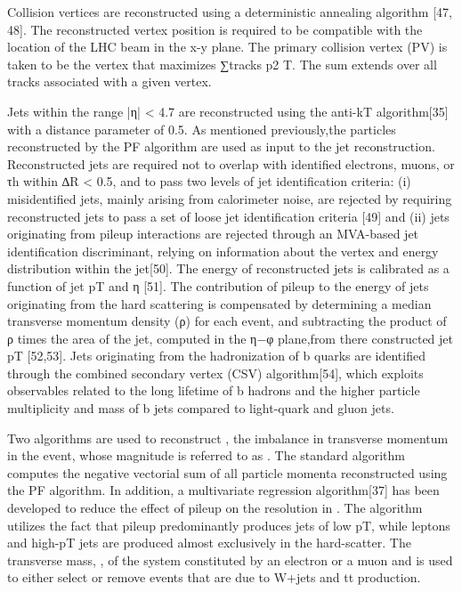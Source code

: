 Collision vertices are reconstructed using a deterministic annealing algorithm [47, 48]. The reconstructed vertex position is required to be compatible with the location of the LHC beam in the x-y plane. The primary collision vertex (PV) is taken to be the vertex that maximizes ∑tracks p2 T. The sum extends over all tracks associated with a given vertex.

Jets within the range |η| < 4.7 are reconstructed using the anti-kT algorithm[35] with a distance parameter of 0.5. As mentioned previously,the particles reconstructed by the PF algorithm are used as input to the jet reconstruction. Reconstructed jets are required not to overlap with identified electrons, muons, or τh within ∆R < 0.5, and to pass two levels of jet identification criteria: (i) misidentified jets, mainly arising from calorimeter noise, are rejected by requiring reconstructed jets to pass a set of loose jet identification criteria [49] and (ii) jets originating from pileup interactions are rejected through an MVA-based jet identification discriminant, relying on information about the vertex and energy distribution within the jet[50]. The energy of reconstructed jets is calibrated as a function of jet pT and η [51]. The contribution of pileup to the energy of jets originating from the hard scattering is compensated by determining a median transverse momentum density (ρ) for each event, and subtracting the product of ρ times the area of the jet, computed in the η−φ plane,from there constructed jet pT [52,53]. Jets originating from the hadronization of b quarks are identiﬁed through the combined secondary vertex (CSV) algorithm[54], which exploits observables related to the long lifetime of b hadrons and the higher particle multiplicity and mass of b jets compared to light-quark and gluon jets.

Two algorithms are used to reconstruct \ptvecmiss , the imbalance in transverse momentum in the event, whose magnitude is referred to as \met . The standard algorithm computes the negative vectorial sum of all particle momenta reconstructed using the PF algorithm. In addition, a multivariate regression algorithm[37] has been developed to reduce the effect of pileup on the resolution in \met. The algorithm utilizes the fact that pileup predominantly produces jets of low pT, while leptons and high-pT jets are produced almost exclusively in the hard-scatter. The transverse mass, \mt, of the system constituted by an electron or a muon and \met is used to either select or remove events that are due to W+jets and tt production. 

